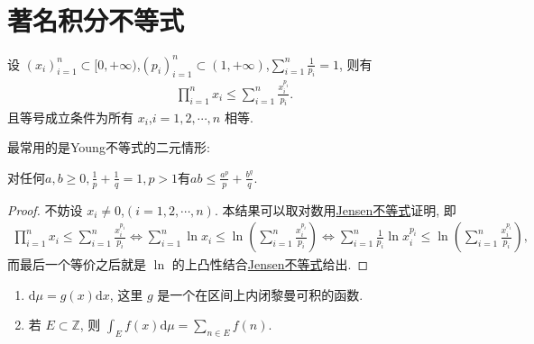 \documentclass[../../main.tex]{subfiles}
\begin{document}
\section{著名积分不等式}

\begin{theorem}[Young不等式初等形式]\label{theorem:Young不等式初等形式}
设 $(x_i)_{i = 1}^n \subset [0, +\infty)$,$(p_i)_{i = 1}^n \subset (1, +\infty)$,$\sum_{i = 1}^n \frac{1}{p_i} = 1$, 则有
\begin{align*}
\prod_{i = 1}^n x_i \leqslant \sum_{i = 1}^n \frac{x_i^{p_i}}{p_i}.
\end{align*}
且等号成立条件为所有 $x_i$,$i = 1,2,\cdots,n$ 相等.
\end{theorem}
\begin{note}
最常用的是Young不等式的二元情形:

对任何$a,b\geqslant 0,\frac{1}{p}+\frac{1}{q}=1,p>1$有$ab\leqslant \frac{a^p}{p}+\frac{b^q}{q}.$
\end{note}
\begin{proof}
不妨设 $x_i \neq 0$,$(i = 1,2,\cdots,n)$. 本结果可以取对数用\hyperref[theorem:Jensen不等式1111]{Jensen不等式}证明, 即
\begin{align*}
\prod_{i = 1}^n x_i \leqslant \sum_{i = 1}^n \frac{x_i^{p_i}}{p_i}\Leftrightarrow \sum_{i = 1}^n \ln x_i \leqslant \ln \left(\sum_{i = 1}^n \frac{x_i^{p_i}}{p_i}\right) \Leftrightarrow \sum_{i = 1}^n \frac{1}{p_i} \ln x_i^{p_i} \leqslant \ln \left(\sum_{i = 1}^n \frac{x_i^{p_i}}{p_i}\right),
\end{align*}
而最后一个等价之后就是 $\ln$ 的上凸性结合\hyperref[theorem:Jensen不等式1111]{Jensen不等式}给出.
\end{proof}

\begin{definition}
\begin{enumerate}[(1)]
\item $\mathrm{d}\mu = g(x)\mathrm{d}x$, 这里 $g$ 是一个在区间上内闭黎曼可积的函数.
\item 若 $E \subset \mathbb{Z}$, 则 $\int_E f(x) \mathrm{d}\mu = \sum_{n \in E} f(n)$.
\end{enumerate}
\end{definition}
\end{document}
